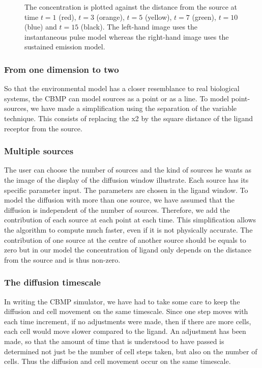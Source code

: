 \documentclass[12pt]{article}
\begin{document}
\begin{figure}[H]
\centering
\caption{The concentration is plotted against the distance from the source
  at time \(t=1\) (red), \(t=3\) 
  (orange), \(t=5\) (yellow), \(t=7\) (green), \(t=10\) (blue) and \(t=15\) (black).
  The left-hand image uses the instantaneous pulse model whereas the right-hand 
  image uses the sustained emission model.} 
\end{figure}

\subsubsection{From one dimension to two}
So that the environmental model has a closer resemblance to real 
biological systems, the CBMP can model sources as a point or as a line. 
To model point-sources, we have made a simplification using the 
separation of the variable technique. This consists of replacing the x2 
by the square distance of the ligand receptor from the source.

\subsubsection{Multiple sources}
The user can choose the number of sources and the kind of sources he 
wants as the image of the display of the diffusion window illustrate. 
Each source has its specific parameter input. The parameters are chosen 
in the ligand window. To model the diffusion with more than one source, 
we have assumed that the diffusion is independent of the number of 
sources. Therefore, we add the contribution of each source at each point 
at each time. This simplification allows the algorithm to compute much 
faster, even if it is not physically accurate. The contribution of one 
source at the centre of another source should be equals to zero but in 
our model the concentration of ligand only depends on the distance from 
the source and is thus non-zero. 

\subsubsection{The diffusion timescale}
In writing the CBMP simulator, we have had to take some care to keep the 
diffusion and cell movement on the same timescale. Since one step moves 
with each time increment, if no adjustments were made, then if there are 
more cells, each cell would move slower compared to the ligand. An 
adjustment has been made, so that the amount of time that is understood 
to have passed is determined not just be the number of cell steps taken, 
but also on the number of cells. Thus the diffusion and cell movement 
occur on the same timescale.
\end{document}
